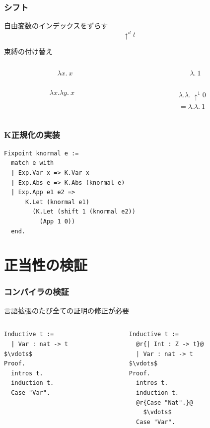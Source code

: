 \documentclass[dvipdfmx,cjk,xcolor=dvipsnames,envcountsect,notheorems,12pt]{beamer}
\theoremstyle{definition}
\begin{document}
\begin{frame}
	\frametitle{シフト}
	\LARGE 自由変数のインデックスをずらす
	\[\uparrow^d t \]

	束縛の付け替え
	\begin{columns}
		\begin{column}{0.5\textwidth}
			\[ \lambda x.~x \]
		\end{column}
		\begin{column}{0.5\textwidth}
			\[ \lambda.~1 \]
		\end{column}
	\end{columns}

	\vfill

	\begin{columns}
		\begin{column}{0.5\textwidth}
			\[ \lambda x.\lambda y.~x \]
		\end{column}
		\begin{column}{0.5\textwidth}
			\[
				\begin{array}{l}
					\lambda.\lambda.~\uparrow^1 0 \\
					= \lambda. \lambda.~1
				\end{array}
			\]
		\end{column}
	\end{columns}
\end{frame}

\begin{frame}[fragile]
	\frametitle{K正規化の実装}
\begin{lstlisting}[frame=none]
Fixpoint knormal e :=
  match e with
  | Exp.Var x => K.Var x
  | Exp.Abs e => K.Abs (knormal e)
  | Exp.App e1 e2 =>
      K.Let (knormal e1)
        (K.Let (shift 1 (knormal e2))
          (App 1 0))
  end.
\end{lstlisting}
\end{frame}

\section{正当性の検証}

\begin{frame}[fragile]
	\frametitle{コンパイラの検証}
	\Large 言語拡張のたび全ての証明の修正が必要
	\begin{columns}
		\begin{column}{0.5\textwidth}
\begin{lstlisting}[frame=none]
Inductive t :=
  | Var : nat -> t
$\vdots$
Proof.
  intros t.
  induction t.
  Case "Var".
\end{lstlisting}
		\end{column}
		\begin{column}{0.5\textwidth}
\begin{lstlisting}[frame=none]
Inductive t :=
  @r{| Int : Z -> t}@
  | Var : nat -> t
$\vdots$
Proof.
  intros t.
  induction t.
  @r{Case "Nat".}@
    $\vdots$
  Case "Var".
\end{lstlisting}
		\end{column}
	\end{columns}
\end{frame}
\end{document}
